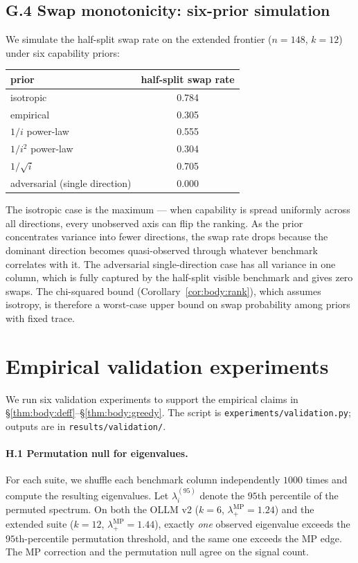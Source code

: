 \documentclass{article}
\begin{document}
\subsection*{G.4 Swap monotonicity: six-prior simulation}

We simulate the half-split swap rate on the extended frontier
($n = 148$, $k = 12$) under six capability priors:
\begin{center}\small
\begin{tabular}{lc}
\toprule
prior & half-split swap rate \\
\midrule
isotropic                       & 0.784 \\
empirical                       & 0.305 \\
$1/i$ power-law                 & 0.555 \\
$1/i^2$ power-law               & 0.304 \\
$1/\sqrt{i}$                    & 0.705 \\
adversarial (single direction)  & 0.000 \\
\bottomrule
\end{tabular}
\end{center}
\noindent The isotropic case is the maximum --- when capability is
spread uniformly across all directions, every unobserved axis can flip
the ranking. As the prior concentrates variance into fewer directions,
the swap rate drops because the dominant direction becomes
quasi-observed through whatever benchmark correlates with it. The
adversarial single-direction case has all variance in one column,
which is fully captured by the half-split visible benchmark and gives
zero swaps. The chi-squared bound (Corollary~\ref{cor:body:rank}),
which assumes isotropy, is therefore a worst-case upper bound on
swap probability among priors with fixed trace.

\section{Empirical validation experiments}
\label{app:validation}

We run six validation experiments to support the empirical claims in
\S\ref{thm:body:deff}--\S\ref{thm:body:greedy}. The script is
\texttt{experiments/validation.py}; outputs are in
\texttt{results/validation/}.

\paragraph{H.1 Permutation null for eigenvalues.} For each suite, we
shuffle each benchmark column independently $1000$ times and compute
the resulting eigenvalues. Let $\lambda_i^{(95)}$ denote the $95$th
percentile of the permuted spectrum. On both the OLLM v2 ($k = 6$,
$\lambda_+^{\mathrm{MP}} = 1.24$) and the extended suite ($k = 12$,
$\lambda_+^{\mathrm{MP}} = 1.44$), exactly \emph{one} observed
eigenvalue exceeds the $95$th-percentile permutation threshold, and
the same one exceeds the MP edge. The MP correction and the
permutation null agree on the signal count.
\end{document}
